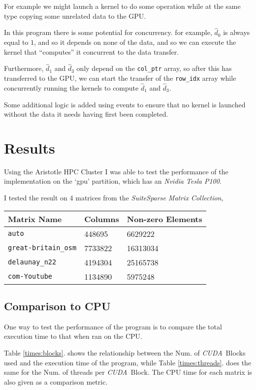 \documentclass[10pt, a4paper]{article}
\newcommand{\cuda}{\textit{CUDA}}
\begin{document}
For example we might launch a kernel to do some operation while at the same type copying some unrelated data
to the GPU.

In this program there is some potential for concurrency. for example, $\hat{d}_0$ is always equal to $1$,
and so it depends on none of the data, and so we can execute the kernel that ``computes'' it concurrent
to the data transfer.

Furthermore, $\hat{d}_1$ and $\hat{d}_3$ only depend on the \verb|col_ptr| array, so after this has transferred
to the GPU, we can start the transfer of the \verb|row_idx| array while concurrently running the kernels
to compute $\hat{d}_1$ and $\hat{d}_3$.

Some additional logic is added using events to ensure that no kernel is launched without the data it needs
having first been completed.

\section{Results}
Using the Aristotle HPC Cluster I was able to test the performance of the implementation on
the `gpu' partition, which has an \textit{Nvidia Tesla P100}.

I tested the result on 4 matrices from the \textit{SuiteSparse Matrix Collection},

\begin{tabular}{l l l}
	Matrix Name & Columns & Non-zero Elements \\
	\hline
	\verb|auto| & 448695 & 6629222 \\
	\verb|great-britain_osm| & 7733822 & 16313034 \\
	\verb|delaunay_n22| & 4194304 & 25165738 \\
	\verb|com-Youtube| & 1134890 & 5975248
\end{tabular}

\subsection{Comparison to CPU}
One way to test the performance of the program is to compare the total execution time to that when
ran on the CPU.

Table \ref{times:blocks}. shows the relationship between the Num. of \cuda \ Blocks used and the execution time
of the program, while Table \ref{times:threads}. does the same for the Num. of threads per \cuda \ Block. 
The CPU time for each matrix is also given as a comparison metric.
\end{document}
